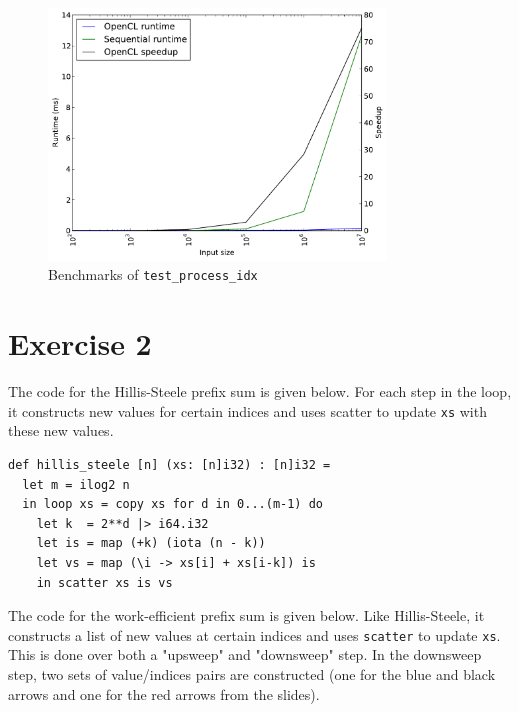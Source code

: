 \documentclass{article}
\begin{document}
\begin{figure}
    \centering
    \includegraphics[width=0.8\textwidth]{test_process_idx.pdf}
    \caption{Benchmarks of \texttt{test\_process\_idx}}
\end{figure}

\FloatBarrier

\section*{Exercise 2}

The code for the Hillis-Steele prefix sum is given below.
For each step in the loop, it constructs new values for certain indices and uses
scatter to update \verb|xs| with these new values.

\begin{verbatim}
def hillis_steele [n] (xs: [n]i32) : [n]i32 =
  let m = ilog2 n
  in loop xs = copy xs for d in 0...(m-1) do
    let k  = 2**d |> i64.i32
    let is = map (+k) (iota (n - k))
    let vs = map (\i -> xs[i] + xs[i-k]) is
    in scatter xs is vs
\end{verbatim}

The code for the work-efficient prefix sum is given below.
Like Hillis-Steele, it constructs a list of new values at certain indices and
uses \verb|scatter| to update \verb|xs|. This is done over both a "upsweep" and
"downsweep" step. In the downsweep step, two sets of value/indices pairs are
constructed (one for the blue and black arrows and one for the red arrows from
the slides).
\end{document}
